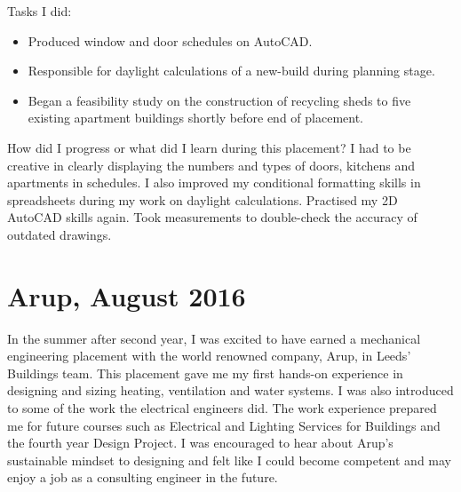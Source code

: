 
Tasks I did:
\begin{itemize}
	\item Produced window and door schedules on AutoCAD.
	\item Responsible for daylight calculations of a new-build during planning stage.
	\item Began a feasibility study on the construction of recycling sheds to five existing apartment buildings shortly before end of placement.
\end{itemize}

How did I progress or what did I learn during this placement?
I had to be creative in clearly displaying the numbers and types of doors, kitchens and apartments in schedules.
I also improved my conditional formatting skills in spreadsheets during my work on daylight calculations.
Practised my 2D AutoCAD skills again.
Took measurements to double-check the accuracy of outdated drawings.




\section{Arup, August 2016}


In the summer after second year, I was excited to have earned a mechanical engineering placement with the world renowned company, Arup, in Leeds' Buildings team.
This placement gave me my first hands-on experience in designing and sizing heating, ventilation and water systems.
I was also introduced to some of the work the electrical engineers did.
The work experience prepared me for future courses such as Electrical and Lighting Services for Buildings and the fourth year Design Project.
I was encouraged to hear about Arup's sustainable mindset to designing and felt like I could become competent and may enjoy a job as a consulting engineer in the future.



